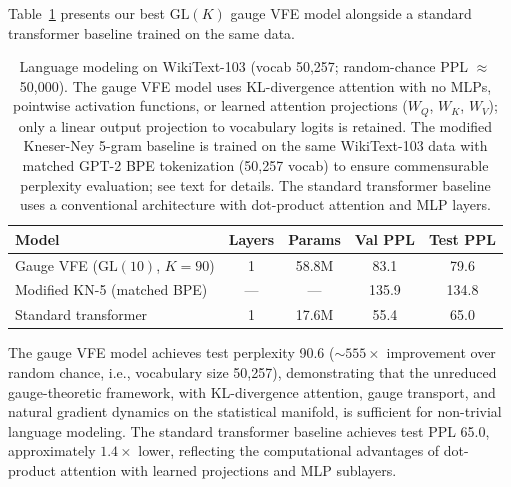 \documentclass[twoside,11pt]{article}
\begin{document}
Table~\ref{tab:glk_results} presents our best $\mathrm{GL}(K)$ gauge VFE model alongside a standard transformer baseline trained on the same data.

\begin{table}[h]
\centering
\begin{tabular}{lcccc}
\hline
\textbf{Model} & \textbf{Layers} & \textbf{Params} & \textbf{Val PPL} & \textbf{Test PPL} \\
\hline
Gauge VFE ($\mathrm{GL}(10)$, $K\!=\!90$) & 1 & 58.8M & 83.1 & 79.6 \\
Modified KN-5 (matched BPE) & --- & --- & 135.9 & 134.8 \\
\hline
Standard transformer & 1 & 17.6M & 55.4 & 65.0 \\
\hline
\end{tabular}
\caption{Language modeling on WikiText-103 (vocab 50{,}257; random-chance PPL $\approx$ 50{,}000). The gauge VFE model uses KL-divergence attention with no MLPs, pointwise activation functions, or learned attention projections ($W_Q$, $W_K$, $W_V$); only a linear output projection to vocabulary logits is retained. The modified Kneser-Ney 5-gram baseline \citep{chen1998empirical} is trained on the same WikiText-103 data with matched GPT-2 BPE tokenization (50{,}257 vocab) to ensure commensurable perplexity evaluation; see text for details. The standard transformer baseline uses a conventional architecture with dot-product attention and MLP layers.}
\label{tab:glk_results}
\end{table}

The gauge VFE model achieves test perplexity 90.6 (${\sim}555\times$ improvement over random chance, i.e., vocabulary size 50{,}257), demonstrating that the unreduced gauge-theoretic framework, with KL-divergence attention, gauge transport, and natural gradient dynamics on the statistical manifold, is sufficient for non-trivial language modeling. The standard transformer baseline achieves test PPL 65.0, approximately $1.4\times$ lower, reflecting the computational advantages of dot-product attention with learned projections and MLP sublayers.
\end{document}
